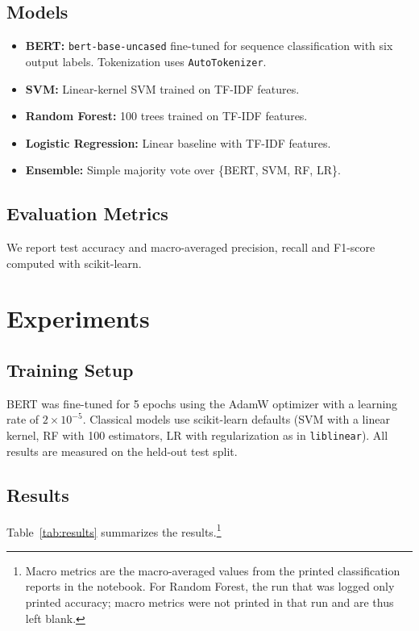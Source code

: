\documentclass[11pt,a4paper]{article}
\begin{document}
\subsection{Models}
\begin{itemize}[leftmargin=1.2em]
    \item \textbf{BERT:} \texttt{bert-base-uncased} fine-tuned for sequence classification with six output labels. Tokenization uses \texttt{AutoTokenizer}.
    \item \textbf{SVM:} Linear-kernel SVM trained on TF-IDF features.
    \item \textbf{Random Forest:} 100 trees trained on TF-IDF features.
    \item \textbf{Logistic Regression:} Linear baseline with TF-IDF features.
    \item \textbf{Ensemble:} Simple majority vote over \{BERT, SVM, RF, LR\}.
\end{itemize}

\subsection{Evaluation Metrics}
We report test accuracy and macro-averaged precision, recall and F1-score computed with scikit-learn.

\section{Experiments}
\subsection{Training Setup}
BERT was fine-tuned for 5 epochs using the AdamW optimizer with a learning rate of $2 \times 10^{-5}$. Classical models use scikit-learn defaults (SVM with a linear kernel, RF with 100 estimators, LR with regularization as in \texttt{liblinear}). All results are measured on the held-out test split.

\subsection{Results}
Table~\ref{tab:results} summarizes the results.\footnote{Macro metrics are the macro-averaged values from the printed classification reports in the notebook. For Random Forest, the run that was logged only printed accuracy; macro metrics were not printed in that run and are thus left blank.}
\end{document}
